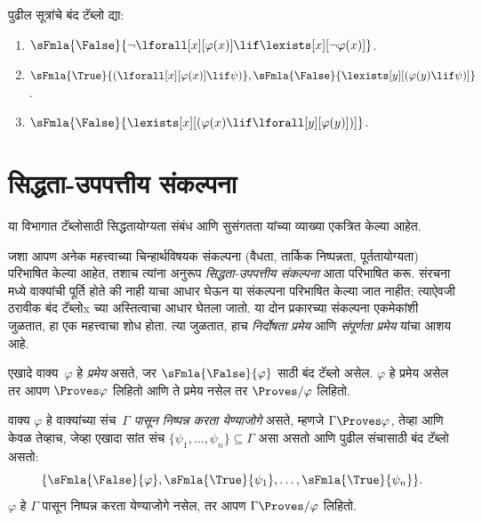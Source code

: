 \begin{prob}
पुढील सूत्रांचे बंद टॅब्लो द्या:
\begin{enumerate}
\item $\sFmla{\False}{\lnot\lforall[x][\varphi(x)] \lif \lexists[x][\lnot\varphi(x)]}$.
\item $\sFmla{\True}{(\lforall[x][\varphi(x)] \lif \psi)}, \sFmla{\False}{\lexists[y][(\varphi(y) \lif \psi)]}$.
\item $\sFmla{\False}{\lexists[x][(\varphi(x) \lif \lforall[y][\varphi(y)])]}$.
\end{enumerate}
\end{prob}












\section{सिद्धता-उपपत्तीय संकल्पना}\label{fol:tab:ptn:sec}

\begin{editorial}
या विभागात टॅब्लोसाठी सिद्धतायोग्यता संबंध आणि सुसंगतता यांच्या व्याख्या
एकत्रित केल्या आहेत.
\end{editorial}

\begin{explain}
जशा आपण अनेक महत्त्वाच्या चिन्हार्थविषयक संकल्पना (वैधता, तार्किक निष्पन्नता,
पूर्ततायोग्यता) परिभाषित केल्या आहेत, तशाच त्यांना अनुरूप
\emph{सिद्धता-उपपत्तीय संकल्पना} आता परिभाषित करू. संरचना मध्ये
वाक्यांची पूर्ति होते की नाही याचा आधार घेऊन या संकल्पना परिभाषित
केल्या जात नाहीत; त्याऐवजी ठरावीक बंद टॅब्लोx च्या अस्तित्वाचा आधार
घेतला जातो. या दोन प्रकारच्या संकल्पना एकमेकांशी जुळतात, हा एक महत्त्वाचा
शोध होता. त्या जुळतात, हाच \emph{निर्दोषता प्रमेय} आणि
\emph{संपूर्णता प्रमेय} यांचा आशय आहे.
\end{explain}


\begin{defn}[प्रमेये]
एखादे वाक्य~$\varphi$ हे \emph{प्रमेय} असते, जर
$\sFmla{\False}{\varphi}$ साठी बंद टॅब्लो असेल. $\varphi$ हे प्रमेय असेल
तर आपण $\Proves \varphi$ लिहितो आणि ते प्रमेय नसेल तर $\Proves/ \varphi$ लिहितो.
\end{defn}

\begin{defn}[निष्पन्नता]
वाक्य $\varphi$ हे वाक्यांच्या संच~$\Gamma$ \emph{पासून
निष्पन्न करता येण्याजोगे} असते, म्हणजे $\Gamma \Proves \varphi$, तेव्हा आणि केवळ तेव्हाच,
जेव्हा एखादा सांत संच $\{\psi_1, \dots, \psi_n\} \subseteq \Gamma$ असा असतो
आणि पुढील संचासाठी बंद टॅब्लो असतो:
\[\{
  \sFmla{\False}{\varphi},
  \sFmla{\True}{\psi_1}, \dots,
  \sFmla{\True}{\psi_n}
  \}.
\]
$\varphi$ हे $\Gamma$ पासून निष्पन्न करता येण्याजोगे नसेल, तर आपण $\Gamma \Proves/
\varphi$ लिहितो.
\end{defn}

